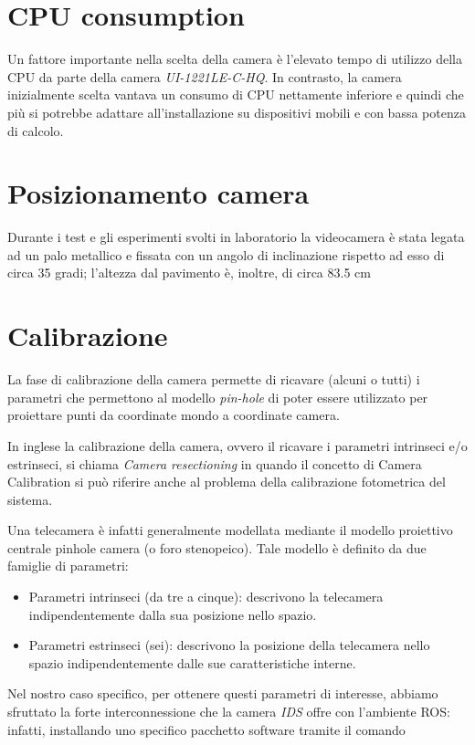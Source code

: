 \section{CPU consumption}
Un fattore importante nella scelta della camera è l'elevato tempo di utilizzo della CPU da parte della camera \textit{UI-1221LE-C-HQ}. In contrasto, la camera inizialmente scelta vantava un consumo di CPU nettamente inferiore e quindi che più si potrebbe adattare all'installazione su dispositivi mobili e con bassa potenza di calcolo.

\section{Posizionamento camera}

Durante i test e gli esperimenti svolti in laboratorio la videocamera è stata legata ad un palo metallico e fissata con un angolo di inclinazione rispetto ad esso di circa 35 gradi; l'altezza dal pavimento è, inoltre, di circa 83.5 cm

\section{Calibrazione}
La fase di calibrazione della camera permette di ricavare (alcuni o tutti) i parametri che permettono al modello \textit{pin-hole} di poter essere utilizzato per proiettare punti da coordinate mondo a coordinate camera. 

In inglese la calibrazione della camera, ovvero il ricavare i parametri intrinseci e/o estrinseci, si chiama \textit{Camera resectioning} in quando il concetto di Camera Calibration si può riferire anche al problema della calibrazione fotometrica del sistema.

Una telecamera è infatti generalmente modellata mediante il modello proiettivo centrale pinhole camera (o foro stenopeico). Tale modello è definito da due famiglie di parametri:

\begin{itemize}
	\item Parametri intrinseci (da tre a cinque): descrivono la telecamera indipendentemente dalla sua posizione nello spazio.
	\item Parametri estrinseci (sei): descrivono la posizione della telecamera nello spazio indipendentemente dalle sue caratteristiche interne.
\end{itemize}

Nel nostro caso specifico, per ottenere questi parametri di interesse, abbiamo sfruttato la forte interconnessione che la camera \textit{IDS} offre con l'ambiente ROS: infatti, installando uno specifico pacchetto software tramite il comando 

